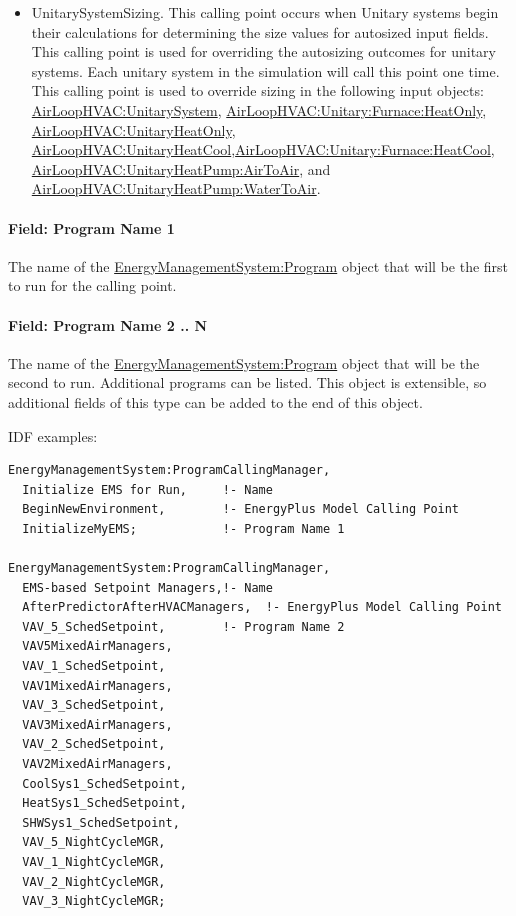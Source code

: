 \begin{itemize}
\item
  UnitarySystemSizing. This calling point occurs when Unitary systems begin their calculations for determining the size values for autosized input fields. This calling point is used for overriding the autosizing outcomes for unitary systems. Each unitary system in the simulation will call this point one time. This calling point is used to override sizing in the following input objects: \hyperref[airloophvacunitarysystem]{AirLoopHVAC:UnitarySystem}, \hyperref[airloophvacunitaryfurnaceheatonly]{AirLoopHVAC:Unitary:Furnace:HeatOnly}, \hyperref[airloophvacunitaryheatonly]{AirLoopHVAC:UnitaryHeatOnly}, \hyperref[airloophvacunitaryheatcool]{AirLoopHVAC:UnitaryHeatCool},\hyperref[airloophvacunitaryfurnaceheatcool]{AirLoopHVAC:Unitary:Furnace:HeatCool}, \hyperref[airloophvacunitaryheatpumpairtoair]{AirLoopHVAC:UnitaryHeatPump:AirToAir}, and \hyperref[airloophvacunitaryheatpumpwatertoair]{AirLoopHVAC:UnitaryHeatPump:WaterToAir}.
\end{itemize}

\paragraph{Field: Program Name 1}\label{field-program-name-1}

The name of the \hyperref[energymanagementsystemprogram]{EnergyManagementSystem:Program} object that will be the first to run for the calling point.

\paragraph{Field: Program Name 2 .. N}\label{field-program-name-2-..-n}

The name of the \hyperref[energymanagementsystemprogram]{EnergyManagementSystem:Program} object that will be the second to run. Additional programs can be listed. This object is extensible, so additional fields of this type can be added to the end of this object.

IDF examples:

\begin{lstlisting}
EnergyManagementSystem:ProgramCallingManager,
  Initialize EMS for Run,     !- Name
  BeginNewEnvironment,        !- EnergyPlus Model Calling Point
  InitializeMyEMS;            !- Program Name 1

EnergyManagementSystem:ProgramCallingManager,
  EMS-based Setpoint Managers,!- Name
  AfterPredictorAfterHVACManagers,  !- EnergyPlus Model Calling Point
  VAV_5_SchedSetpoint,        !- Program Name 2
  VAV5MixedAirManagers,
  VAV_1_SchedSetpoint,
  VAV1MixedAirManagers,
  VAV_3_SchedSetpoint,
  VAV3MixedAirManagers,
  VAV_2_SchedSetpoint,
  VAV2MixedAirManagers,
  CoolSys1_SchedSetpoint,
  HeatSys1_SchedSetpoint,
  SHWSys1_SchedSetpoint,
  VAV_5_NightCycleMGR,
  VAV_1_NightCycleMGR,
  VAV_2_NightCycleMGR,
  VAV_3_NightCycleMGR;
\end{lstlisting}

